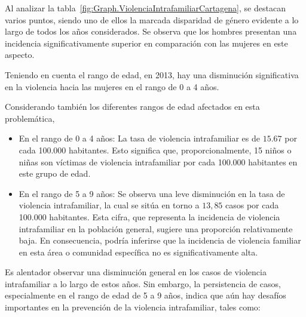 \documentclass[letterpaper, 12pt]{article}
\begin{document}
Al analizar la
tabla~\ref{fig:Graph.ViolenciaIntrafamiliarCartagena}, se
destacan varios puntos, siendo uno de ellos la marcada
disparidad de género evidente a lo largo de todos los años
considerados. Se observa que los hombres presentan una
incidencia significativamente superior en comparación con
las mujeres en este aspecto.

Teniendo en cuenta el rango de edad, en 2013, hay una
disminución significativa en la violencia hacia las mujeres
en el rango de 0 a 4 años.

Considerando también los diferentes rangos de edad
afectados en esta problemática,

\begin{itemize}[label=$\diamond$]
    \item En el rango de 0 a 4 años: La tasa de violencia
          intrafamiliar es de $15.67$ por cada 100.000 habitantes.
          Esto significa que, proporcionalmente, 15 niños o niñas son
          víctimas de violencia intrafamiliar por cada 100.000
          habitantes en este grupo de edad.

    \item En el rango de 5 a 9 años: Se observa una leve disminución
          en la tasa de violencia intrafamiliar, la cual se sitúa en
          torno a $13,85$ casos por cada 100.000 habitantes. Esta
          cifra, que representa la incidencia de violencia
          intrafamiliar en la población general, sugiere una
          proporción relativamente baja. En consecuencia, podría
          inferirse que la incidencia de violencia familiar en esta
          área o comunidad específica no es significativamente alta.
\end{itemize}

Es alentador observar una disminución general en los casos
de violencia intrafamiliar a lo largo de estos años. Sin
embargo, la persistencia de casos, especialmente en el
rango de edad de 5 a 9 años, indica que aún hay desafíos
importantes en la prevención de la violencia intrafamiliar,
tales como:
\end{document}
